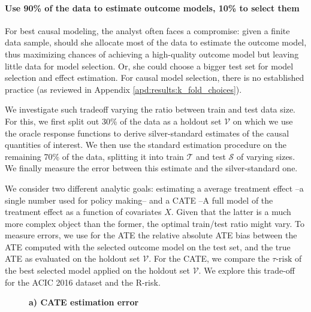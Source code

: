 \documentclass[10pt]{article}
\begin{document}
\begin{multicols}{2}
    \paragraph{Use 90\% of the data to estimate outcome models, 10\% to
        select them}

    For best causal modeling, the analyst often faces a compromise: given a finite
    data sample, should she allocate most of the data to estimate the outcome model,
    thus maximizing chances of achieving a high-quality outcome model but leaving
    little data for model selection. Or, she could choose a bigger test set for
    model selection and effect estimation. For causal model selection, there
    is no established practice (as reviewed in Appendix \ref{apd:results:k_fold_choices}).

    We investigate such tradeoff varying the ratio between train and test
    data size. For this, we first split out 30\% of the data as a holdout set
    $\mathcal{V}$ on which we use the oracle response functions to derive
    silver-standard estimates of the causal quantities of interest. We then
    use the standard estimation procedure on the remaining 70\% of the data,
    splitting it into train $\mathcal{T}$ and test $\mathcal{S}$ of varying
    sizes. We finally measure the error between this estimate and the
    silver-standard one.

    We consider two different analytic goals: estimating a average
    treatment effect --a single number used for policy making-- and a
    CATE --A full model of the treatment effect as a function of covariates
    $X$. Given that the latter is a much more complex object than the former,
    the optimal train/test ratio might vary. To measure errors, we use for
    the ATE the relative absolute ATE bias between the ATE computed with the
    selected outcome model on the test set, and the true ATE as evaluated on
    the holdout set $\mathcal{V}$. For the CATE, we compare the
    $\tau\text{-risk}$
    of the best selected model applied on the holdout set $\mathcal{V}$. We explore this trade-off for the ACIC 2016 dataset and the R-risk.

    \begin{figure}[!t]
        \begin{minipage}{.5\textwidth}
            \centerline{\textbf{a) CATE estimation error}}


\end{minipage}
\end{figure}
\end{multicols}
\end{document}
